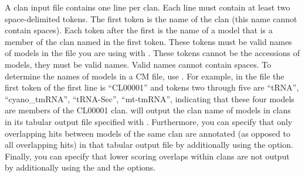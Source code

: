 A clan input file contains one line per clan. Each line must contain
at least two space-delimited tokens. The first token is the name of
the clan (this name cannot contain spaces). Each token after the first
is the name of a model that is a member of the clan named in the first
token. These tokens must be valid names of models in the file
 you are using with . These tokens
cannot be the accessions of models, they must be valid names. Valid
names cannot contain spaces. To determine the names of models in a CM
file, use . For example, in the file
 the first token of the first line is
``CL00001'' and tokens two through five are ``tRNA'', ``cyano_tmRNA'',
``tRNA-Sec'', ``mt-tmRNA'', indicating that these four models are
members of the CL00001 clan.  will output the clan name
of models in clans in its tabular output file specified with
. Furthermore, you can specify that only overlapping
hits between models of the same clan are annotated (as opposed to all
overlapping hits) in that tabular output file by additionally using
the  option. Finally, you can specify that lower
 scoring overlaps within clans are not output by additionally using the
 and the  options.




